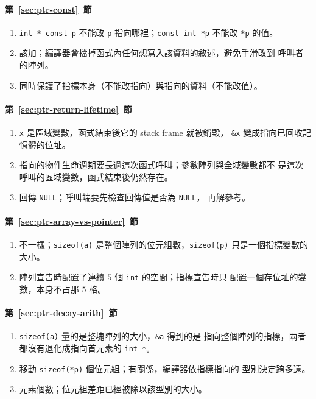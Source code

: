 \paragraph{第~\ref{sec:ptr-const}~節}
\begin{enumerate}
\item \texttt{int * const p} 不能改 \texttt{p} 指向哪裡；\texttt{const
int *p} 不能改 \texttt{*p} 的值。
\item 該加；編譯器會擋掉函式內任何想寫入該資料的敘述，避免手滑改到
呼叫者的陣列。
\item 同時保護了指標本身（不能改指向）與指向的資料（不能改值）。
\end{enumerate}

\paragraph{第~\ref{sec:ptr-return-lifetime}~節}
\begin{enumerate}
\item \texttt{x} 是區域變數，函式結束後它的 stack frame 就被銷毀，
\texttt{\&x} 變成指向已回收記憶體的位址。
\item 指向的物件生命週期要長過這次函式呼叫；參數陣列與全域變數都不
是這次呼叫的區域變數，函式結束後仍然存在。
\item 回傳 \texttt{NULL}；呼叫端要先檢查回傳值是否為 \texttt{NULL}，
再解參考。
\end{enumerate}

\paragraph{第~\ref{sec:ptr-array-vs-pointer}~節}
\begin{enumerate}
\item 不一樣；\texttt{sizeof(a)} 是整個陣列的位元組數，\texttt{sizeof(p)}
只是一個指標變數的大小。
\item 陣列宣告時配置了連續 $5$ 個 \texttt{int} 的空間；指標宣告時只
配置一個存位址的變數，本身不占那 $5$ 格。
\end{enumerate}

\paragraph{第~\ref{sec:ptr-decay-arith}~節}
\begin{enumerate}
\item \texttt{sizeof(a)} 量的是整塊陣列的大小，\texttt{\&a} 得到的是
指向整個陣列的指標，兩者都沒有退化成指向首元素的 \texttt{int *}。
\item 移動 \texttt{sizeof(*p)} 個位元組；有關係，編譯器依指標指向的
型別決定跨多遠。
\item 元素個數；位元組差距已經被除以該型別的大小。
\end{enumerate}


